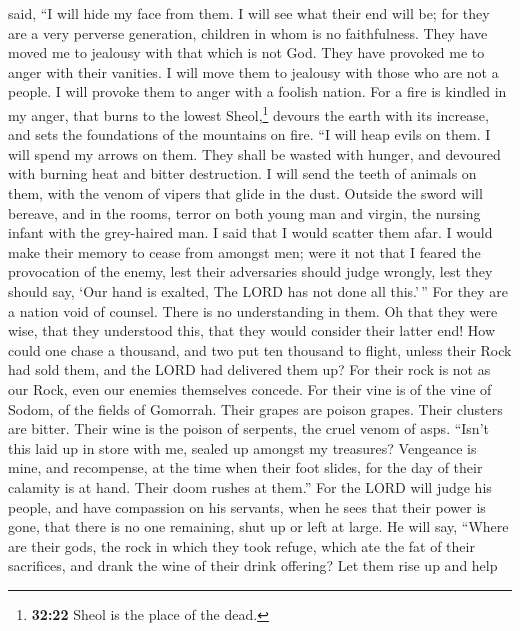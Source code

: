 said, ``I will hide my face from them. I will see what their end will
be; for they are a very perverse generation, children in whom is no
faithfulness.  They have moved me to jealousy with that
which is not God. They have provoked me to anger with their vanities. I
will move them to jealousy with those who are not a people. I will
provoke them to anger with a foolish nation.  For a fire
is kindled in my anger, that burns to the lowest Sheol,\footnote{\textbf{32:22}
  Sheol is the place of the dead.} devours the earth with its increase,
and sets the foundations of the mountains on fire.  ``I
will heap evils on them. I will spend my arrows on them. 
They shall be wasted with hunger, and devoured with burning heat and
bitter destruction. I will send the teeth of animals on them, with the
venom of vipers that glide in the dust.  Outside the
sword will bereave, and in the rooms, terror on both young man and
virgin, the nursing infant with the grey-haired man.  I
said that I would scatter them afar. I would make their memory to cease
from amongst men;  were it not that I feared the
provocation of the enemy, lest their adversaries should judge wrongly,
lest they should say, `Our hand is exalted, The LORD has not done all
this.'\,''  For they are a nation void of counsel. There
is no understanding in them.  Oh that they were wise,
that they understood this, that they would consider their latter end!
 How could one chase a thousand, and two put ten thousand
to flight, unless their Rock had sold them, and the LORD had delivered
them up?  For their rock is not as our Rock, even our
enemies themselves concede.  For their vine is of the
vine of Sodom, of the fields of Gomorrah. Their grapes are poison
grapes. Their clusters are bitter.  Their wine is the
poison of serpents, the cruel venom of asps.  ``Isn't
this laid up in store with me, sealed up amongst my treasures?
 Vengeance is mine, and recompense, at the time when
their foot slides, for the day of their calamity is at hand. Their doom
rushes at them.''  For the LORD will judge his people,
and have compassion on his servants, when he sees that their power is
gone, that there is no one remaining, shut up or left at large.
 He will say, ``Where are their gods, the rock in which
they took refuge,  which ate the fat of their sacrifices,
and drank the wine of their drink offering? Let them rise up and help
